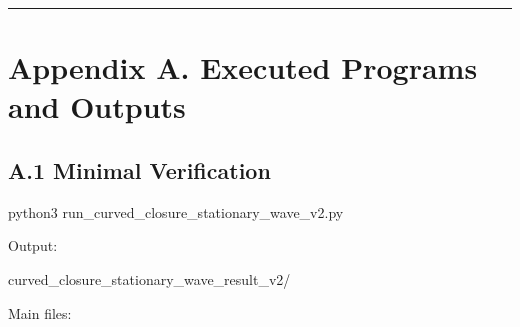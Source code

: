 \documentclass[
  a4paper,
]{article}
\newenvironment{Shaded}{}{}
\newcommand{\NormalTok}[1]{#1}
\begin{document}
\begin{center}\rule{0.5\linewidth}{0.5pt}\end{center}

\section{Appendix A. Executed Programs and
Outputs}\label{appendix-a.-executed-programs-and-outputs}

\subsection{A.1 Minimal Verification}\label{a.1-minimal-verification}

\begin{Shaded}
\begin{Highlighting}[]
\NormalTok{python3 run\_curved\_closure\_stationary\_wave\_v2.py}
\end{Highlighting}
\end{Shaded}

Output:

\begin{Shaded}
\begin{Highlighting}[]
\NormalTok{curved\_closure\_stationary\_wave\_result\_v2/}
\end{Highlighting}
\end{Shaded}

Main files:
\end{document}
